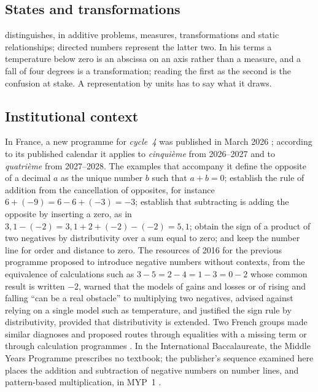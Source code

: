 \documentclass[11pt,a4paper]{article}
\theoremstyle{definition}
\begin{document}
\subsection{States and transformations}
\citet{Vergnaud1982} distinguishes, in additive problems, measures, transformations and static relationships; directed numbers represent the latter two. In his terms a temperature below zero is an abscissa on an axis rather than a measure, and a fall of four degrees is a transformation; reading the first as the second is the confusion at stake. A representation by units has to say what it draws.

\subsection{Institutional context}
In France, a new programme for \emph{cycle~4} was published in March 2026 \citep{MEN2026Arrete}; according to its published calendar it applies to \emph{cinqui\`eme} from 2026--2027 and to \emph{quatri\`eme} from 2027--2028. The examples that accompany it \citep{MEN2026Exemples} define the opposite of a decimal $a$ as the unique number $b$ such that $a+b=0$; establish the rule of addition from the cancellation of opposites, for instance $6+(-9)=6-6+(-3)=-3$; establish that subtracting is adding the opposite by inserting a zero, as in $3{,}1-(-2)=3{,}1+2+(-2)-(-2)=5{,}1$; obtain the sign of a product of two negatives by distributivity over a sum equal to zero; and keep the number line for order and distance to zero. The resources of 2016 for the previous programme \citep{Eduscol2016Relatifs} proposed to introduce negative numbers without contexts, from the equivalence of calculations such as $3-5=2-4=1-3=0-2$ whose common result is written $-2$, warned that the models of gains and losses or of rising and falling ``can be a real obstacle'' to multiplying two negatives, advised against relying on a single model such as temperature, and justified the sign rule by distributivity, provided that distributivity is extended. Two French groups made similar diagnoses and proposed routes through equalities with a missing term \citep{IREMAquitaine2008} or through calculation programmes \citep{Matheron2016}. In the International Baccalaureate, the Middle Years Programme prescribes no textbook; the publisher's sequence examined here places the addition and subtraction of negative numbers on number lines, and pattern-based multiplication, in MYP~1 \citep{Haese2022Scope}.

\end{document}

